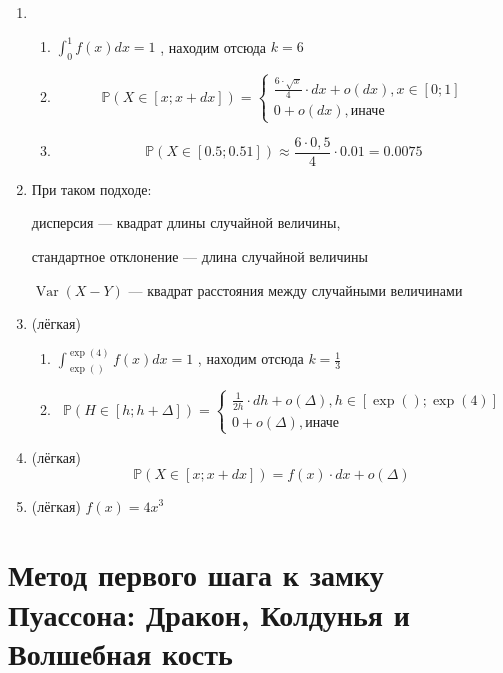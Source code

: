 \documentclass[a4paper,12pt]{article}
\DeclareMathOperator{\Var}{Var}
\def \P{\mathbb{P}}
\begin{document}
\begin{enumerate}
\item \begin{enumerate}
    \item $\int_0^1 f(x)dx=1$ , находим отсюда $k=6$
    \item \[
   \P(X\in [x;x+dx])=
   \begin{cases}
   \frac{6\cdot \sqrt{x}}{4}\cdot dx+o(dx), x\in[0 ; 1] \\
    0+o(dx), \text{иначе}
    \end{cases}
\]
    \item
\[
\P(X\in [0.5;0.51]) \approx \frac{6\cdot 0,5}{4}\cdot 0.01=0.0075
\]

    \end{enumerate}
\item
При таком подходе:

дисперсия — квадрат длины случайной величины,

стандартное отклонение — длина случайной величины

$\Var(X-Y)$ — квадрат расстояния между случайными величинами
\item (лёгкая)
\begin{enumerate}
    \item $\int_{\exp()}^{\exp(4)} f(x)dx=1$ , находим отсюда $k=\frac{1}{3}$
    \item \[
  \P(H \in [h; h + \Delta])=
   \begin{cases}
   \frac{1}{2h}\cdot dh+o(\Delta), h\in[\exp() ; \exp(4)] \\
    0+o(\Delta), \text{иначе}
    \end{cases}
\]
    \end{enumerate}
\item (лёгкая)
\[
   \P(X\in [x;x+dx])= f(x)\cdot dx+o(\Delta)
\]
\item (лёгкая)
$f(x)=4x^3$
\end{enumerate}


\newpage
\section{Метод первого шага к замку Пуассона: Дракон, Колдунья и Волшебная кость} %
\end{document}
